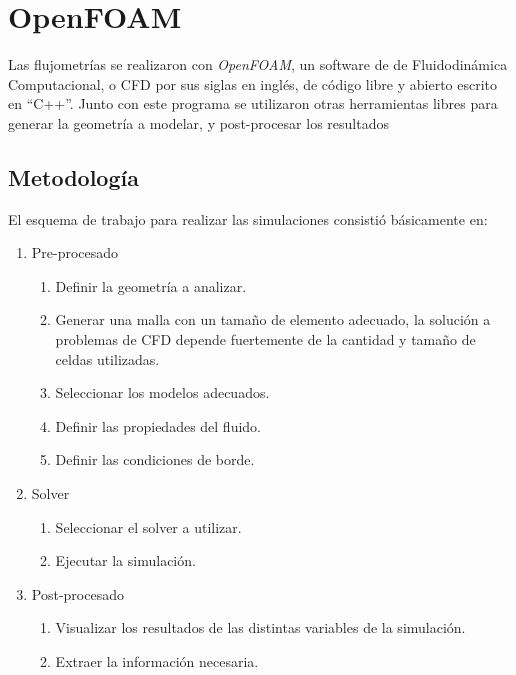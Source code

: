 \section{OpenFOAM}
%
Las flujometrías se realizaron con \emph{OpenFOAM}, un software de de
Fluidodinámica Computacional, o CFD por sus siglas en inglés, de código libre y
abierto escrito en ``C++''.
%
%
Junto con este programa se utilizaron otras herramientas libres para generar la
geometría a modelar, y post-procesar los resultados
%
\subsection{Metodología}
%
El esquema de trabajo para realizar las simulaciones consistió básicamente en:

\begin{enumerate}
    \item Pre-procesado
        \begin{enumerate}
            \item Definir la geometría a analizar.
            \item Generar una malla con un tamaño de elemento adecuado, la
                solución a problemas de CFD depende fuertemente de la cantidad
                y tamaño de celdas utilizadas.
            \item Seleccionar los modelos adecuados.
            \item Definir las propiedades del fluido.
            \item Definir las condiciones de borde.

        \end{enumerate}
    \item Solver
    \begin{enumerate} \item Seleccionar el solver a utilizar.
            \item Ejecutar la simulación.
    \end{enumerate}
\item Post-procesado
    \begin{enumerate}
        \item Visualizar los resultados de las distintas variables de la
            simulación.
        \item Extraer la información necesaria.
    \end{enumerate}
\end{enumerate}

